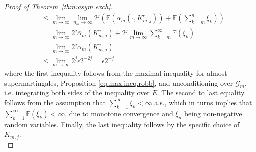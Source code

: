 \documentclass{article}
\theoremstyle{definition}
\renewcommand{\&}{and}
\begin{document}
\begin{proof}[Proof of Theorem~\ref{thm:asym.exch}]
\begin{align*}
         & \leq  \lim_{m \to \infty }  \lim_{n_{m} \to \infty}     2^{j} \left( \mathbb{E}(\alpha_{m}(\cdot, K^{c}_{m,j}) ) + \mathbb{E}( \sum_{k=m}^{n_{m}} \xi_{k} )\right)   \\
            & =  \lim_{ m\to \infty }      2^{j}  \bar{\alpha}_{m}( K^{c}_{m,j})  +  2^{j}  \lim_{ m\to \infty } \sum_{k=m}^{\infty}  \mathbb{E} (\xi_{k} )  \\
              & =  \lim_{ m\to \infty }      2^{j}  \bar{\alpha}_{m}( K^{c}_{m,j})     \\
               & \leq   \lim_{ m\to \infty }      2^{j}  \epsilon 2^{-2j}  = \epsilon 2^{-j}
\end{align*}
where the first inequality  follows from the maximal inequality for almost supermartingales, Proposition \ref{eq:max.ineq.robb}, and unconditioning over $\mathcal{G}_{m}$, i.e. integrating both sides of the inequality over $E$. The second to last equality follows from the assumption that $\sum_{k=1}^{\infty} \xi_{k} <\infty$ a.s., which in turns implies that $\sum_{k=1}^{\infty} \mathbb{E}( \xi_{k} )<\infty$, due to monotone convergence and $\xi_{n}$ being non-negative random variables. Finally, the last inequality follows by the specific choice of $K_{m,j}$. \vspace{0.2cm}  \\

\end{proof}
\end{document}
